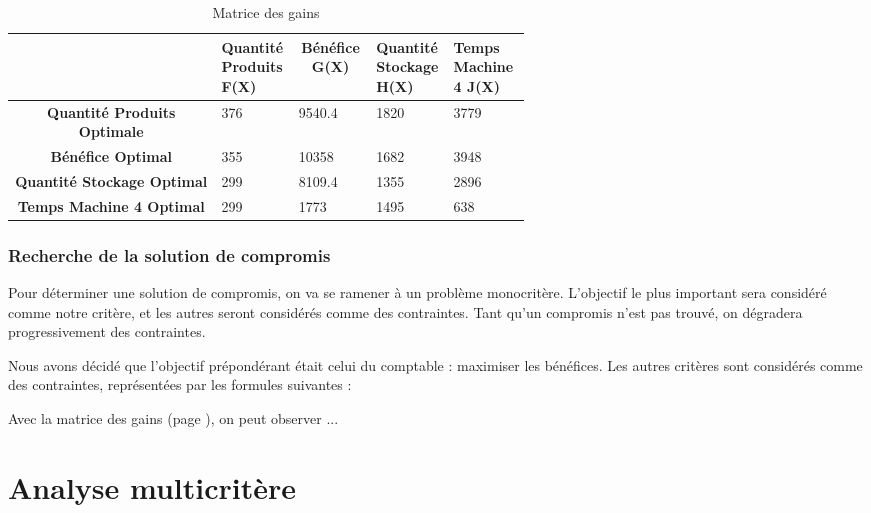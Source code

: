 \documentclass[a4paper,10pt]{article}
\begin{document}
\begin{table}[h]
\centering
\caption{Matrice des gains}
\label{tab:matgain}
\begin{tabular}{c|p{0.15\linewidth}|p{0.15\linewidth}|p{0.15\linewidth}|p{0.15\linewidth}|}
\cline{2-5}
 & \multicolumn{1}{p{0.15\linewidth}|}{\textbf{Quantité Produits F(X)}} & \multicolumn{1}{c|}{\textbf{Bénéfice G(X)}} & \multicolumn{1}{p{0.15\linewidth}|}{\textbf{Quantité Stockage H(X)}} & \multicolumn{1}{p{0.15\linewidth}|}{\textbf{Temps Machine 4 J(X)}} \\ \hline
\multicolumn{1}{|p{0.15\linewidth}|}{\textbf{Quantité Produits Optimale}} & 376 & 9540.4 & 1820 & 3779 \\ \hline
\multicolumn{1}{|p{0.15\linewidth}|}{\textbf{Bénéfice Optimal}} & 355 & 10358 & 1682 & 3948 \\ \hline
\multicolumn{1}{|p{0.15\linewidth}|}{\textbf{Quantité Stockage Optimal}} & 299 & 8109.4 & 1355 & 2896 \\ \hline
\multicolumn{1}{|p{0.15\linewidth}|}{\textbf{Temps Machine 4 Optimal}} & 299 & 1773 & 1495 & 638 \\ \hline
\end{tabular}
\end{table}


\section{Recherche de la solution de compromis}

Pour déterminer une solution de compromis, on va se ramener à un problème monocritère. L'objectif le plus important sera considéré comme notre critère, et les autres seront considérés comme des contraintes. Tant qu'un compromis n'est pas trouvé, on dégradera progressivement des contraintes.

Nous avons décidé que l'objectif prépondérant était celui du comptable : maximiser les bénéfices. Les autres critères sont considérés comme des contraintes, représentées par les formules suivantes :

Avec la matrice des gains (page \pageref{tab:matgain}), on peut observer ...


\newpage
\part{Analyse multicritère}
\end{document}
